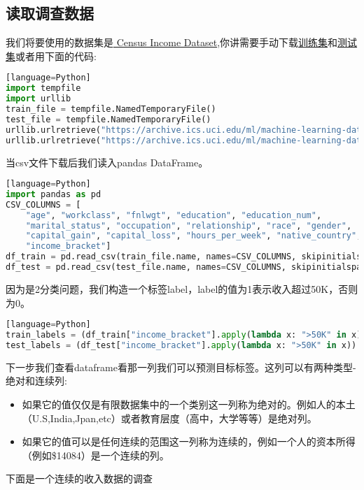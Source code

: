 \subsection{读取调查数据}
我们将要使用的数据集是\href{https://archive.ics.uci.edu/ml/datasets/Census+Income}{ Census Income Dataset},你讲需要手动下载\href{https://archive.ics.uci.edu/ml/machine-learning-databases/adult/adult.data}{训练集}和\href{https://archive.ics.uci.edu/ml/machine-learning-databases/adult/adult.test}{测试集}或者用下面的代码:
\begin{lstlisting}[language=Python][language=Python]
import tempfile
import urllib
train_file = tempfile.NamedTemporaryFile()
test_file = tempfile.NamedTemporaryFile()
urllib.urlretrieve("https://archive.ics.uci.edu/ml/machine-learning-databases/adult/adult.data", train_file.name)
urllib.urlretrieve("https://archive.ics.uci.edu/ml/machine-learning-databases/adult/adult.test", test_file.name)
\end{lstlisting}
当csv文件下载后我们读入pandas DataFrame。
\begin{lstlisting}[language=Python][language=Python]
import pandas as pd
CSV_COLUMNS = [
    "age", "workclass", "fnlwgt", "education", "education_num",
    "marital_status", "occupation", "relationship", "race", "gender",
    "capital_gain", "capital_loss", "hours_per_week", "native_country",
    "income_bracket"]
df_train = pd.read_csv(train_file.name, names=CSV_COLUMNS, skipinitialspace=True)
df_test = pd.read_csv(test_file.name, names=CSV_COLUMNS, skipinitialspace=True, skiprows=1)
\end{lstlisting}
因为是2分类问题，我们构造一个标签label，label的值为1表示收入超过50K，否则为0。
\begin{lstlisting}[language=Python][language=Python]
train_labels = (df_train["income_bracket"].apply(lambda x: ">50K" in x)).astype(int)
test_labels = (df_test["income_bracket"].apply(lambda x: ">50K" in x)).astype(int)
\end{lstlisting}
下一步我们查看dataframe看那一列我们可以预测目标标签。这列可以有两种类型-绝对和连续列:
\begin{itemize}
  \item 如果它的值仅仅是有限数据集中的一个类别这一列称为绝对的。例如人的本土（U.S,India,Jpan,etc）或者教育层度（高中，大学等等）是绝对列。
  \item 如果它的值可以是任何连续的范围这一列称为连续的，例如一个人的资本所得（例如\$14084）是一个连续的列。
\end{itemize}
下面是一个连续的收入数据的调查
